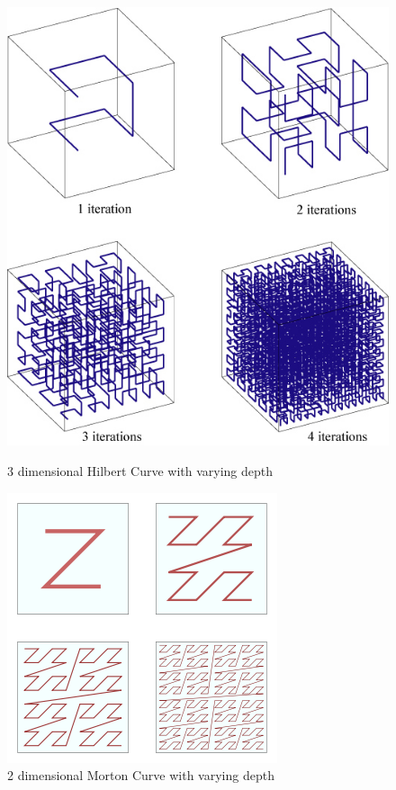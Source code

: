 \documentclass[a0,landscape]{a0poster}
\begin{document}
\begin{multicols}{4}
\begin{figure}[H]
\centering
\includegraphics[width=0.8\linewidth,keepaspectratio]{hilbertcurve3d.jpg}
\caption{ 3 dimensional Hilbert Curve with varying depth \label{hilbertcurve3d}}
\endminipage\hfil
{}
\centering
\includegraphics[width=0.8\linewidth,keepaspectratio]{morton.png}
\caption{ 2 dimensional Morton Curve with varying depth \label{morton}}
\endminipage\hfill
\end{figure}


\end{multicols}
\end{document}
